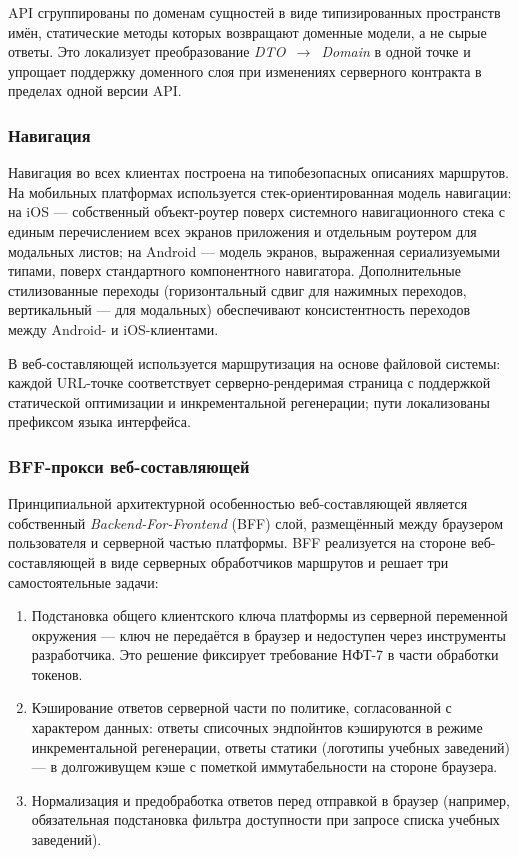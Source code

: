 API сгруппированы по доменам сущностей в виде типизированных пространств имён, статические методы которых возвращают доменные модели, а не сырые ответы. Это локализует преобразование \emph{DTO~$\to$~Domain} в одной точке и упрощает поддержку доменного слоя при изменениях серверного контракта в пределах одной версии API.

\subsubsection{Навигация}
\label{subsubsec:navigation}

Навигация во всех клиентах построена на типобезопасных описаниях маршрутов. На мобильных платформах используется стек-ориентированная модель навигации: на iOS --- собственный объект-роутер поверх системного навигационного стека с единым перечислением всех экранов приложения и отдельным роутером для модальных листов; на Android --- модель экранов, выраженная сериализуемыми типами, поверх стандартного компонентного навигатора. Дополнительные стилизованные переходы (горизонтальный сдвиг для нажимных переходов, вертикальный --- для модальных) обеспечивают консистентность переходов между Android- и iOS-клиентами.

В веб-составляющей используется маршрутизация на основе файловой системы: каждой URL-точке соответствует серверно-рендеримая страница с поддержкой статической оптимизации и инкрементальной регенерации; пути локализованы префиксом языка интерфейса.

\subsubsection{BFF-прокси веб-составляющей}
\label{subsubsec:bff}

Принципиальной архитектурной особенностью веб-составляющей является собственный \emph{Backend-For-Frontend} (BFF) слой, размещённый между браузером пользователя и серверной частью платформы. BFF реализуется на стороне веб-составляющей в виде серверных обработчиков маршрутов и решает три самостоятельные задачи:

\begin{enumerate}
  \item Подстановка общего клиентского ключа платформы из серверной переменной окружения --- ключ не передаётся в браузер и недоступен через инструменты разработчика. Это решение фиксирует требование НФТ-7 в части обработки токенов.
  \item Кэширование ответов серверной части по политике, согласованной с характером данных: ответы списочных эндпойнтов кэшируются в режиме инкрементальной регенерации, ответы статики (логотипы учебных заведений) --- в долгоживущем кэше с пометкой иммутабельности на стороне браузера.
  \item Нормализация и предобработка ответов перед отправкой в браузер (например, обязательная подстановка фильтра доступности при запросе списка учебных заведений).
\end{enumerate}

